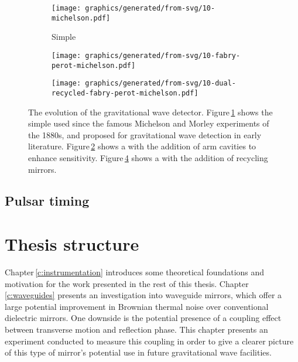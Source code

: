 \begin{figure}
  \begin{center}
    \begin{subfigure}{.3\textwidth}
      \texttt{[image: graphics/generated/from-svg/10-michelson.pdf]}
      \caption{Simple \MI}
      \label{fig:mi}
    \end{subfigure}
    \hfill
    \begin{subfigure}{.3\textwidth}
      \texttt{[image: graphics/generated/from-svg/10-fabry-perot-michelson.pdf]}
      \caption{\FPMI}
      \label{fig:fpmi}
    \end{subfigure}
    \hfill
    \begin{subfigure}{.3\textwidth}
      \texttt{[image: graphics/generated/from-svg/10-dual-recycled-fabry-perot-michelson.pdf]}
      \caption{\DRFPMI}
      \label{fig:drfpmi}
    \end{subfigure}
    \caption[The evolution of the gravitational wave detector]{The evolution of the gravitational wave detector. Figure\,\ref{fig:mi} shows the simple \MI used since the famous Michelson and Morley experiments of the 1880s, and proposed for gravitational wave detection in early literature. Figure\,\ref{fig:fpmi} shows a \MI with the addition of \FP arm cavities to enhance sensitivity. Figure\,\ref{fig:drfpmi} shows a \FPMI with the addition of recycling mirrors.}
  \end{center}
\end{figure}

\subsection{Pulsar timing}

\section{Thesis structure}
Chapter\,\ref{c:instrumentation} introduces some theoretical foundations and motivation for the work presented in the rest of this thesis. Chapter\,\ref{c:waveguides} presents an investigation into waveguide mirrors, which offer a large potential improvement in Brownian thermal noise over conventional dielectric mirrors. One downside is the potential presence of a coupling effect between transverse motion and reflection phase. This chapter presents an experiment conducted to measure this coupling in order to give a clearer picture of this type of mirror's potential use in future gravitational wave facilities.


